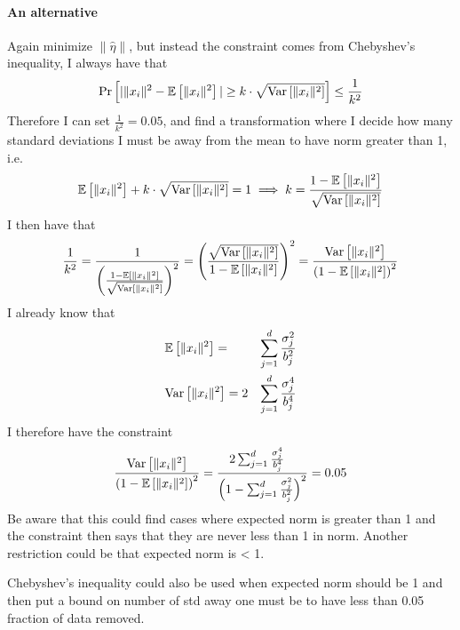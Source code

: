 \documentclass[a4paper,12pt]{article}
\begin{document}
\paragraph*{An alternative}
Again minimize $\| \hat{\eta} \|$, but instead the constraint
comes from Chebyshev's inequality, I always have that
\[
    \Pr\left [ |\|x_i\|^2 - \mathbb{E} \left [ \| x_i \|^2 \right]| \ge k \cdot \sqrt{\text{Var} \left [ \|x_i\|^2  \right]} \right] \le \frac{1}{k^2}
\]
Therefore I can set $\frac{1}{k^2} = 0.05$, and find a 
transformation where I decide how many standard deviations
I must be away from the mean to have norm greater than 1, i.e.
\begin{align*}
    \mathbb{E} \left [ \| x_i \|^2 \right] + k \cdot \sqrt{\text{Var} \left [ \|x_i\|^2  \right]} = 1 \implies k = \frac{1-\mathbb{E} \left [ \| x_i \|^2 \right]}{\sqrt{\text{Var} \left [ \|x_i\|^2  \right]}}
\end{align*}
I then have that
\[
    \frac{1}{k^2} = \frac{1}{\left (\frac{1-\mathbb{E} \left [ \| x_i \|^2 \right]}{\sqrt{\text{Var} \left [ \|x_i\|^2  \right]}}\right)^2} = 
    \left (\frac{\sqrt{\text{Var} \left [ \|x_i\|^2  \right]}}{1-\mathbb{E} \left [ \| x_i \|^2 \right]}\right)^2 = 
    \frac{\text{Var} \left [ \|x_i \|^2  \right]}{\left (1 - \mathbb{E} \left [ \| x_i \|^2 \right]\right)^2}
\]
I already know that
\begin{alignat*}{2}
    &\mathbb{E} \left [ \| x_i \|^2 \right] = &\sum_{j=1}^d \frac{\sigma_j^2}{b_j^2} \\
    &\text{Var} \left [ \|x_i \|^2  \right] = 2 &\sum_{j=1}^d \frac{\sigma_j^4}{b_j^4}
\end{alignat*}
I therefore have the constraint 
\[
    \frac{\text{Var} \left [ \|x_i \|^2  \right]}{\left (1 - \mathbb{E} \left [ \| x_i \|^2 \right]\right)^2} = 
    \frac{2 \sum_{j=1}^d \frac{\sigma_j^4}{b_j^4} \\}
    {\left (1-\sum_{j=1}^d \frac{\sigma_j^2}{b_j^2} \right)^2} = 
    0.05
\]
Be aware that this could find cases where expected norm is greater than 1
and the constraint then says that they are never less than 1 in norm.
Another restriction could be that expected norm is < 1.

Chebyshev's inequality could also be used when expected norm should be 1
and then put a bound on number of std away one must be to have less than 
0.05 fraction of data removed.


{}

\end{document}
